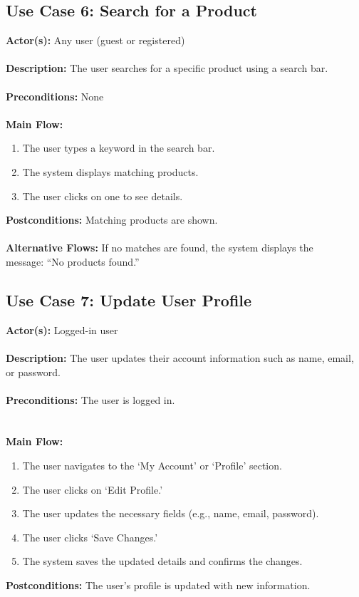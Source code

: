 \documentclass[a4paper,12pt]{article}
\begin{document}
	\subsection*{Use Case 6: Search for a Product}
	\textbf{Actor(s):} Any user (guest or registered) \\ \\
	\textbf{Description:} The user searches for a specific product using a search bar. \\ \\
	\textbf{Preconditions:} None \\ \\
	\textbf{Main Flow:}
	\begin{enumerate}
  		\item The user types a keyword in the search bar.
  		\item The system displays matching products.
  		\item The user clicks on one to see details.
	\end{enumerate}
	\textbf{Postconditions:} Matching products are shown. \\ \\
	\textbf{Alternative Flows:} If no matches are found, the system displays the \\ message: ``No products
	found.''




	\subsection*{Use Case 7: Update User Profile}
	\textbf{Actor(s):} Logged-in user \\ \\
	\textbf{Description:} The user updates their account information such as name, email, or password. \\ \\
	\textbf{Preconditions:} The user is logged in. \\ \\ \\
	\textbf{Main Flow:}
	\begin{enumerate}
	\item The user navigates to the `My Account' or `Profile' section.
	\item The user clicks on `Edit Profile.'
	\item The user updates the necessary fields (e.g., name, email, password).
	\item The user clicks `Save Changes.'
	\item The system saves the updated details and confirms the changes.
	\end{enumerate}
	\textbf{Postconditions:} The user's profile is updated with new information.
\end{document}
